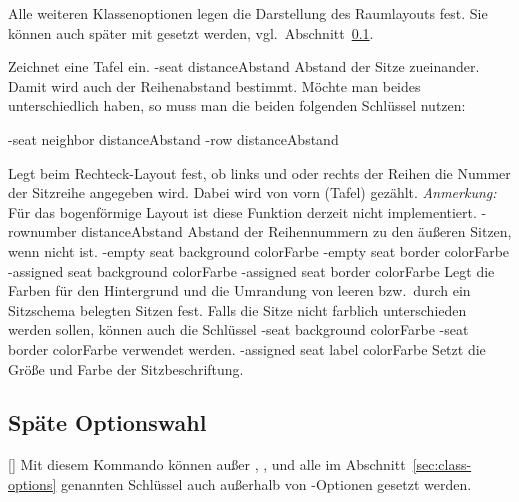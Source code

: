 \documentclass[
babel-options={ngerman},
load-preamble-,
scrartcl={headings=small}
]{cnltx-doc}
\begin{document}
Alle weiteren Klassenoptionen legen die Darstellung des Raumlayouts fest.
Sie können auch später mit  gesetzt werden, vgl.\ Abschnitt~\ref{sec:late-options}.
\begin{options}
  Zeichnet eine Tafel ein.
  \keyval-{seat distance}{Abstand}\Default{2pt}
  Abstand der Sitze zueinander. Damit wird auch der Reihenabstand bestimmt.
  Möchte man beides unterschiedlich haben, so muss man die beiden folgenden
  Schlüssel nutzen:
  
  \keyval-{seat neighbor distance}{Abstand}\Default*{2pt}\vspace{-.3\baselineskip}
  \keyval-{row distance}{Abstand}\Default{2pt}

  Legt beim Rechteck-Layout fest, ob links und oder rechts der Reihen die Nummer
  der Sitzreihe angegeben wird. Dabei wird von vorn (Tafel) gezählt.\newline
  \emph{Anmerkung:} Für das bogenförmige Layout ist diese Funktion derzeit
  nicht implementiert.
  \keyval-{rownumber distance}{Abstand}\Default{2pt}
  Abstand der Reihennummern zu den äußeren Sitzen, wenn 
  nicht  ist.
  \keyval-{empty seat background color}{Farbe}\vspace{-.3\baselineskip}
  \keyval-{empty seat border color}{Farbe}\vspace{-.3\baselineskip}
  \keyval-{assigned seat background color}{Farbe}\vspace{-.3\baselineskip}
  \keyval-{assigned seat border color}{Farbe}
  Legt die Farben für den Hintergrund und die Umrandung von leeren bzw.\ durch
  ein Sitzschema belegten Sitzen fest.
  Falls die Sitze nicht farblich unterschieden werden sollen, können auch die
  Schlüssel
  \keyval-{seat background color}{Farbe}\Default*\vspace{-.3\baselineskip}
  \keyval-{seat border color}{Farbe}\Default
  verwendet werden.
  \vspace{-.3\baselineskip}
  \keyval-{assigned seat label color}{Farbe}
  Setzt die Größe und Farbe der Sitzbeschriftung.
\end{options}
\subsection{Späte Optionswahl}
\label{sec:late-options}
\begin{commands}
  [] Mit diesem Kommando können außer
  , ,  und  alle
  im Abschnitt~\ref{sec:class-options} genannten Schlüssel auch
  außerhalb von -Optionen gesetzt werden.
\end{commands}
\end{document}
